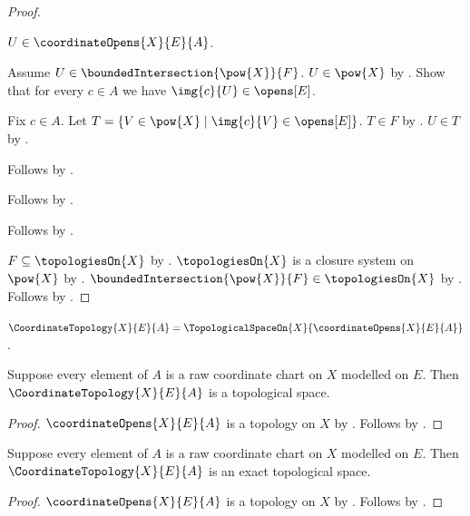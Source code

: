 \begin{proof}
\begin{subproof}
\begin{subproof}
                $U\in\coordinateOpens{X}{E}{A}$.
            \begin{subproof}
                Assume $U\in\boundedIntersection{\pow{X}}{F}$.
                $U\in\pow{X}$ by .
                Show that for every $c\in A$ we have $\img{c}{U}\in\opens[E]$.
                \begin{subproof}
                    Fix $c\in A$.
                    Let $T=\{V\in\pow{X}\mid\img{c}{V}\in\opens[E]\}$.
                    $T\in F$ by \auto.
                    $U\in T$ by .
                \end{subproof}
                Follows by .
            \end{subproof}
            Follows by \auto.
        \end{subproof}
        Follows by .
    \end{subproof}
    $F\subseteq\topologiesOn{X}$ by .
    $\topologiesOn{X}$ is a closure system on $\pow{X}$ by
        .
    $\boundedIntersection{\pow{X}}{F}\in\topologiesOn{X}$ by
        .
    Follows by .
\end{proof}

\begin{definition}\label{coordinate_topology}
    $\CoordinateTopology{X}{E}{A}=\TopologicalSpaceOn{X}{\coordinateOpens{X}{E}{A}}$.
\end{definition}

\begin{theorem}\label{coordinate_topology_is_topological_space}
    Suppose every element of $A$ is a raw coordinate chart on $X$ modelled on $E$.
    Then $\CoordinateTopology{X}{E}{A}$ is a topological space.
\end{theorem}
\begin{proof}
    $\coordinateOpens{X}{E}{A}$ is a topology on $X$ by
        .
    Follows by .
\end{proof}

\begin{theorem}\label{coordinate_topology_is_exact}
    Suppose every element of $A$ is a raw coordinate chart on $X$ modelled on $E$.
    Then $\CoordinateTopology{X}{E}{A}$ is an exact topological space.
\end{theorem}
\begin{proof}
    $\coordinateOpens{X}{E}{A}$ is a topology on $X$ by
        .
    Follows by .
\end{proof}

